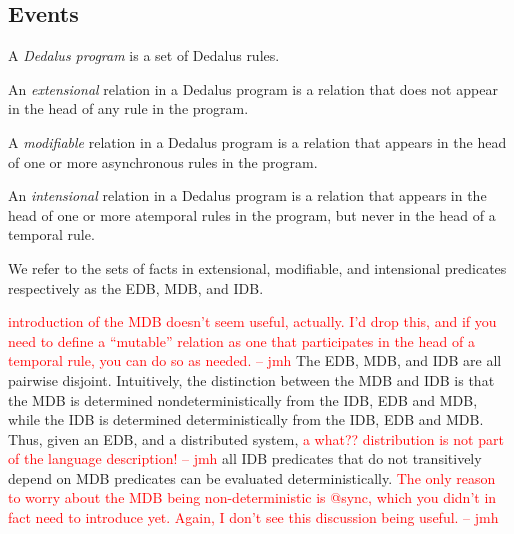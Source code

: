 \documentclass{acm_proc_article-sp-sigmod09}
\newcommand{\jmh}[1]{{\textcolor{red}{#1 -- jmh}}}
\begin{document}

\subsection{Events}


\begin{definition}
%
A {\em Dedalus program} is a set of Dedalus rules.
%
\end{definition}

\begin{definition} 
%
An \emph{extensional} relation in a Dedalus program is a relation that does not
appear in the head of any rule in the program.
%
\end{definition}

\begin{definition}
%
A \emph{modifiable} relation in a Dedalus program is a relation that appears in
the head of one or more asynchronous rules in the program.
%
\end{definition}

 \begin{definition}
%
An \emph{intensional} relation in a Dedalus program is a relation that appears
in the head of one or more atemporal rules in the program, but never in the head of a temporal rule.
%
\end{definition}

We refer to the sets of facts in extensional, modifiable, and intensional
predicates respectively as the EDB, MDB, and IDB.

\jmh{introduction of the MDB doesn't seem useful, actually.  I'd drop this, and if you need to define a ``mutable'' relation as one that participates in the head of a temporal rule, you can do so as needed.}
The EDB, MDB, and IDB are all pairwise disjoint.  Intuitively, the distinction
between the MDB and IDB is that the MDB is determined nondeterministically from
the IDB, EDB and MDB, while the IDB is determined deterministically from the
IDB, EDB and MDB.  Thus, given an EDB, and a distributed system, \jmh{a what??  distribution is not part of the language description!} all IDB
predicates that do not transitively depend on MDB predicates can be evaluated
deterministically.  \jmh{The only reason to worry about the MDB being non-deterministic is @sync, which you didn't in fact need to introduce yet.  Again, I don't see this discussion being useful.}
\end{document}
